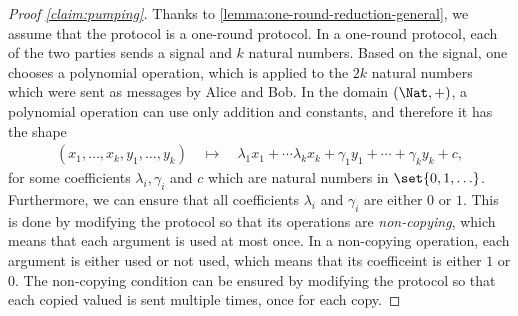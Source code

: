\begin{proof}[Proof \cref{claim:pumping}] Thanks to \cref{lemma:one-round-reduction-general}, we assume  that the protocol is a one-round protocol.     In a one-round protocol, each of the two parties sends a signal and $k$  natural numbers.  Based on the signal, one chooses a polynomial operation, which is applied to the $2k$  natural numbers  which were sent as messages by Alice and Bob.  In the domain $(\Nat,+)$, a polynomial operation can use only addition and constants, and therefore it has the shape 
    \begin{align*}
    (x_1,\ldots,x_k,y_1,\ldots,y_k) \quad \mapsto \quad \lambda_1 x_1 + \cdots \lambda_k x_k + \gamma_1 y_1 + \cdots + \gamma_k y_k + c,
    \end{align*}
    for some coefficients $\lambda_i, \gamma_i$ and $c$ which are natural numbers in $\set{0,1,\ldots}$. Furthermore, we can ensure that all coefficients $\lambda_i$ and $\gamma_i$ are either $0$ or $1$. This is done by modifying the protocol so that its operations  are \emph{non-copying}, which means that each argument is used at most once.  In a non-copying operation, each argument is either used or not used, which means that its coefficeint is either $1$ or $0$. 
    The non-copying condition  can be ensured by modifying the protocol so that each copied valued is sent multiple times, once for each copy. 


\end{proof}
